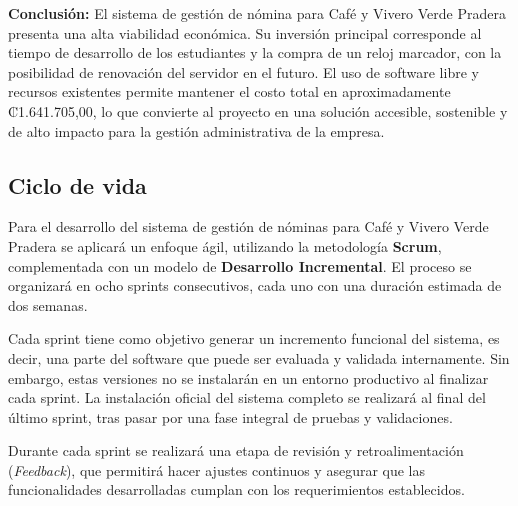 \textbf{Conclusión:}
El sistema de gestión de nómina para Café y Vivero Verde Pradera presenta una alta viabilidad económica.
Su inversión principal corresponde al tiempo de desarrollo de los estudiantes y la compra de un reloj marcador, con la posibilidad de renovación del servidor en el futuro.
El uso de software libre y recursos existentes permite mantener el costo total en aproximadamente ₡1.641.705,00, lo que convierte al proyecto en una solución accesible, sostenible y de alto impacto para la gestión administrativa de la empresa.

\subsection{Ciclo de vida}

Para el desarrollo del sistema de gestión de nóminas para Café y Vivero Verde Pradera se aplicará un enfoque ágil, utilizando la metodología \textbf{Scrum}, complementada con un modelo de \textbf{Desarrollo Incremental}. El proceso se organizará en ocho sprints consecutivos, cada uno con una duración estimada de dos semanas.

Cada sprint tiene como objetivo generar un incremento funcional del sistema, es decir, una parte del software que puede ser evaluada y validada internamente. Sin embargo, estas versiones no se instalarán en un entorno productivo al finalizar cada sprint. La instalación oficial del sistema completo se realizará al final del último sprint, tras pasar por una fase integral de pruebas y validaciones.

Durante cada sprint se realizará una etapa de revisión y retroalimentación (\textit{Feedback}), que permitirá hacer ajustes continuos y asegurar que las funcionalidades desarrolladas cumplan con los requerimientos establecidos.



